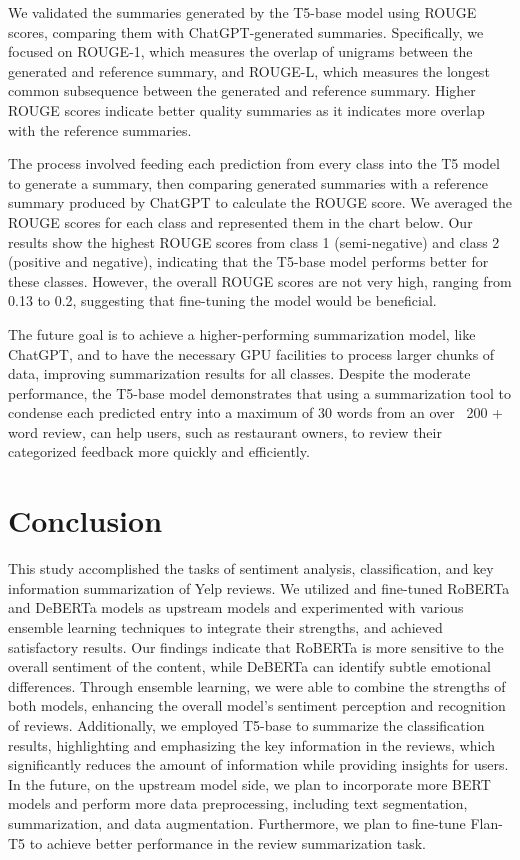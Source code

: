 \documentclass[12pt]{article}
\begin{document}
We validated the summaries generated by the T5-base model using ROUGE scores, comparing them with ChatGPT-generated summaries. Specifically, we focused on ROUGE-1, which measures the overlap of unigrams between the generated and reference summary, and ROUGE-L, which measures the longest common subsequence between the generated and reference summary. Higher ROUGE scores indicate better quality summaries as it indicates more overlap with the reference summaries.

The process involved feeding each prediction from every class into the T5 model to generate a summary, then comparing generated summaries with a reference summary produced by ChatGPT to calculate the ROUGE score. We averaged the ROUGE scores for each class and represented them in the chart below. Our results show the highest ROUGE scores from class 1 (semi-negative) and class 2 (positive and negative), indicating that the T5-base model performs better for these classes. However, the overall ROUGE scores are not very high, ranging from 0.13 to 0.2, suggesting that fine-tuning the model would be beneficial.

The future goal is to achieve a higher-performing summarization model, like ChatGPT, and to have the necessary GPU facilities to process larger chunks of data, improving summarization results for all classes. Despite the moderate performance, the T5-base model demonstrates that using a summarization tool to condense each predicted entry into a maximum of 30 words from an over ~200 + word review, can help users, such as restaurant owners, to review their categorized feedback more quickly and efficiently.


\section{Conclusion}

This study accomplished the tasks of sentiment analysis, classification, and key information summarization of Yelp reviews. We utilized and fine-tuned RoBERTa and DeBERTa models as upstream models and experimented with various ensemble learning techniques to integrate their strengths, and achieved satisfactory results. Our findings indicate that RoBERTa is more sensitive to the overall sentiment of the content, while DeBERTa can identify subtle emotional differences. Through ensemble learning, we were able to combine the strengths of both models, enhancing the overall model's sentiment perception and recognition of reviews. Additionally, we employed T5-base to summarize the classification results, highlighting and emphasizing the key information in the reviews, which significantly reduces the amount of information while providing insights for users. In the future, on the upstream model side, we plan to incorporate more BERT models and perform more data preprocessing, including text segmentation, summarization, and data augmentation. Furthermore, we plan to fine-tune Flan-T5 to achieve better performance in the review summarization task.
\end{document}
